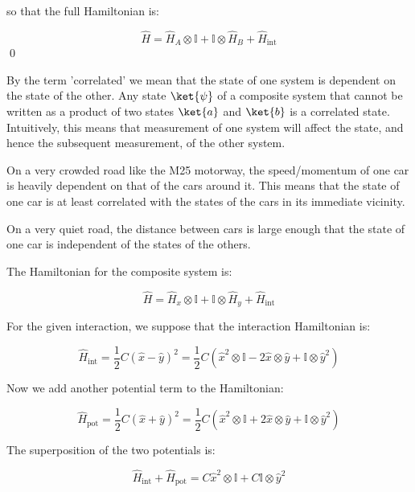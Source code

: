\documentclass[12pt]{article}
\begin{document}
so that the full Hamiltonian is:

\begin{equation}
    \hat{H} = \hat{H}_{A} \otimes \mathbb{I} + \mathbb{I} \otimes \hat{H}_{B} + \hat{H}_{\text{int}}
\end{equation}
\qed


By the term 'correlated' we mean that the state of one system is dependent on the state of the other. Any state $\ket{\psi}$ of a composite system that cannot be written as a product of two states $\ket{a}$ and $\ket{b}$ is a correlated state. Intuitively, this means that measurement of one system will affect the state, and hence the subsequent measurement, of the other system.

On a very crowded road like the M25 motorway, the speed/momentum of one car is heavily dependent on that of the cars around it. This means that the state of one car is at least correlated with the states of the cars in its immediate vicinity.

On a very quiet road, the distance between cars is large enough that the state of one car is independent of the states of the others.


The Hamiltonian for the composite system is:

\begin{equation}
    \hat{H} = \hat{H}_{x} \otimes \mathbb{I} + \mathbb{I} \otimes \hat{H}_{y} + \hat{H}_{\text{int}}
\end{equation}

For the given interaction, we suppose that the interaction Hamiltonian is:

\begin{equation}
    \hat{H}_{\text{int}} = \frac{1}{2} C (\hat{x} - \hat{y})^{2} = \frac{1}{2} C (\hat{x}^{2} \otimes \mathbb{I} - 2\hat{x} \otimes \hat{y} + \mathbb{I} \otimes \hat{y}^{2})
\end{equation}

Now we add another potential term to the Hamiltonian:

\begin{equation}
    \hat{H}_{\text{pot}} = \frac{1}{2} C (\hat{x} + \hat{y})^{2} = \frac{1}{2} C (\hat{x}^{2} \otimes \mathbb{I} + 2\hat{x} \otimes \hat{y} + \mathbb{I} \otimes \hat{y}^{2})
\end{equation}

The superposition of the two potentials is:

\begin{equation}
    \hat{H}_{\text{int}} + \hat{H}_{\text{pot}} = C \hat{x}^{2} \otimes \mathbb{I} + C \mathbb{I} \otimes \hat{y}^{2}
\end{equation}
\end{document}
